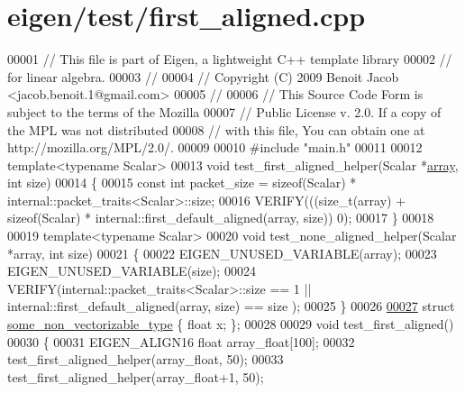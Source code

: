 \hypertarget{eigen_2test_2first__aligned_8cpp_source}{}\section{eigen/test/first\+\_\+aligned.cpp}
\label{eigen_2test_2first__aligned_8cpp_source}

\begin{DoxyCode}
00001 \textcolor{comment}{// This file is part of Eigen, a lightweight C++ template library}
00002 \textcolor{comment}{// for linear algebra.}
00003 \textcolor{comment}{//}
00004 \textcolor{comment}{// Copyright (C) 2009 Benoit Jacob <jacob.benoit.1@gmail.com>}
00005 \textcolor{comment}{//}
00006 \textcolor{comment}{// This Source Code Form is subject to the terms of the Mozilla}
00007 \textcolor{comment}{// Public License v. 2.0. If a copy of the MPL was not distributed}
00008 \textcolor{comment}{// with this file, You can obtain one at http://mozilla.org/MPL/2.0/.}
00009 
00010 \textcolor{preprocessor}{#include "main.h"}
00011 
00012 \textcolor{keyword}{template}<\textcolor{keyword}{typename} Scalar>
00013 \textcolor{keywordtype}{void} test\_first\_aligned\_helper(Scalar *\hyperlink{class_eigen_1_1array}{array}, \textcolor{keywordtype}{int} size)
00014 \{
00015   \textcolor{keyword}{const} \textcolor{keywordtype}{int} packet\_size = \textcolor{keyword}{sizeof}(Scalar) * internal::packet\_traits<Scalar>::size;
00016   VERIFY(((\textcolor{keywordtype}{size\_t}(array) + \textcolor{keyword}{sizeof}(Scalar) * internal::first\_default\_aligned(array, size)) %
       0);
00017 \}
00018 
00019 \textcolor{keyword}{template}<\textcolor{keyword}{typename} Scalar>
00020 \textcolor{keywordtype}{void} test\_none\_aligned\_helper(Scalar *array, \textcolor{keywordtype}{int} size)
00021 \{
00022   EIGEN\_UNUSED\_VARIABLE(array);
00023   EIGEN\_UNUSED\_VARIABLE(size);
00024   VERIFY(internal::packet\_traits<Scalar>::size == 1 || internal::first\_default\_aligned(array, size) == size
      );
00025 \}
00026 
\hyperlink{structsome__non__vectorizable__type}{00027} \textcolor{keyword}{struct }\hyperlink{structsome__non__vectorizable__type}{some\_non\_vectorizable\_type} \{ \textcolor{keywordtype}{float} x; \};
00028 
00029 \textcolor{keywordtype}{void} test\_first\_aligned()
00030 \{
00031   EIGEN\_ALIGN16 \textcolor{keywordtype}{float} array\_float[100];
00032   test\_first\_aligned\_helper(array\_float, 50);
00033   test\_first\_aligned\_helper(array\_float+1, 50);

\end{DoxyCode}
